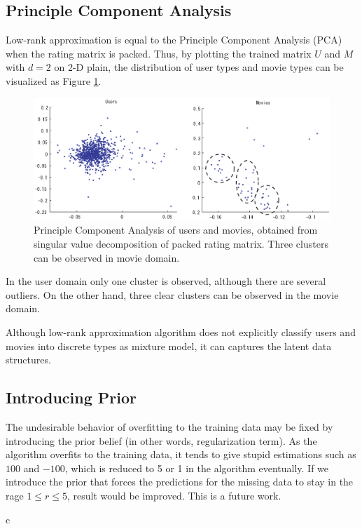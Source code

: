 \documentclass{article}
\begin{document}
\subsection{Principle Component Analysis}
Low-rank approximation is equal to the Principle Component Analysis (PCA) when the rating matrix is packed. Thus, by plotting the trained matrix $U$ and $M$ with $d=2$ on 2-D plain, the distribution of user types and movie types can be visualized as Figure \ref{fig:pca}.

\begin{figure}[htbp]
  \begin{center}
    \includegraphics[scale=.75]{figure/pca}
  \end{center}
  \caption{Principle Component Analysis of users and movies, obtained from singular value decomposition of packed rating matrix. Three clusters can be observed in movie domain.}
  \label{fig:pca}
\end{figure}

In the user domain only one cluster is observed, although there are several outliers. On the other hand, three clear clusters can be observed in the movie domain. 

Although low-rank approximation algorithm does not explicitly classify users and movies into discrete types as mixture model, it can captures the latent data structures. 

\subsection{Introducing Prior}
The undesirable behavior of overfitting to the training data may be fixed by introducing the prior belief (in other words, regularization term). As the algorithm overfits to the training data, it tends to give stupid estimations such as $100$ and $-100$, which is reduced to 5 or 1 in the algorithm eventually. If we introduce the prior that forces the predictions for the missing data to stay in the rage $1 \le r \le 5$, result would be improved. This is a future work.


\if c\LaTeXe
\quad
\else
\end{document}
